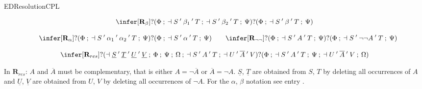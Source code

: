 \begin{entry}{EDResolutionCPL}  



\begin{calculus}


$$\infer[\textbf{R}_{\beta}]
{?(\Phi\:;\:\dashv S\:'\:\beta_{1}\:'\:T\:;\:\dashv S\:'\:\beta_{2}\:'\:T\:;\:\Psi)}
{?(\Phi\:;\:\dashv S\:'\:\beta\:'\:T\:;\:\Psi)} $$

\vspace{-0.3cm}

$$
\quad
\infer[\textbf{R}_{\alpha}]
{?(\Phi\:;\:\dashv S\:'\:\alpha_{1}\:'\:\alpha_{2}\:'\:T\:;\:\Psi)}
{?(\Phi\:;\:\dashv   S\:'\:\alpha\:'\:T\:;\:\Psi)}
\qquad
\infer[\textbf{R}_{\neg\neg}]
{?(\Phi\:;\:\dashv S\:'\:A\:'\:T\:;\:\Psi)}
{?(\Phi\:;\:\dashv S\:'\:\neg\neg A\:'\:T\:;\:\Psi)}$$

\vspace{-0.3cm}

$$\infer[\textbf{R}_{res}]
{?(\dashv \underline{S}\:'\:\underline{T}\:'\:\underline{U}\:'\:\underline{V}\:;\:\Phi\:;\:\Psi\:;\:\Omega\:;\:\dashv S\:'\: A\:'\:T\:;\:\dashv U\:'\:\overline{A}\:'\:V)}
{?(\Phi\:;\:\dashv S\:'\: A\:'\:T\:;\:\Psi\:;\:\dashv U\:'\:\overline{A}\:'\:V\:;\:\Omega )}$$

In $\mathbf{R}_{res}$: $A$ and $\overline{A}$ must be complementary, that is either $A = \lnot \overline{A}$ or $\overline{A} = \lnot A$. $\underline{S}$, $\underline{T}$ are obtained from $S$, $T$ by deleting all occurrences of $A$ and $\underline{U}$, $\underline{V}$ are obtained from $U$, $V$ by deleting all occurrences of $\lnot A$. For the $\alpha$, $\beta$ notation see entry .
\end{calculus}



\end{entry}
